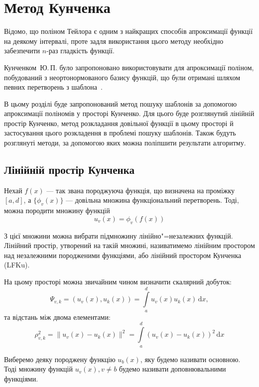 \chapter{Метод Кунченка}
\label{chap:selected}

Відомо, що поліном Тейлора є одним з найкращих способів апроксимації функції на деякому інтервалі, проте задля
використання цього методу необхідно забезпечити $n$-раз гладкість функції.

Кунченком~Ю.\,П. було запропоновано використовувати для апроксимації поліном, побудований з неортонормованого базису
функцій, що були отримані шляхом певних перетворень з шаблона~\cite{book6}.

В цьому розділі буде запропонований метод пошуку шаблонів за допомогою апроксимації поліномів у просторі Кунченко.
Для цього буде розглянутий лінійній простір Кунченко, метод розкладання довільної функції в цьому просторі й
застосування цього розкладення в проблемі пошуку шаблонів.
Також будуть розглянуті методи, за допомогою яких можна поліпшити результати алгоритму.

\section{Лінійній простір Кунченка}
    Нехай $f(x)$ --- так звана породжуюча функція, що визначена на проміжку ${[a, d]}$, а $\{ \phi_v( x ) \}$ ---
    довільна множина функціональний перетворень.
    Тоді, можна породити множину функцій
    \begin{equation}
        u_v(x) = \phi_v( f( x ))
    \end{equation}

    З цієї множини можна вибрати підмножину лінійно"=незалежних функцій.
    Лінійний простір, утворений на такій множині, називатимемо лінійним простором над незалежними породженими
    функціями, або лінійний простором Кунченка (LFKu).

    На цьому просторі можна звичайним чином визначити скалярний добуток:
    \begin{equation}
        \Psi_{v,k} = (u_v( x ), u_k( x ) ) = \int\limits_a^d u_v( x ) u_k( x )\,\mathrm{d}x,
    \end{equation}
    та відстань між двома елементами:
    \begin{equation}
        \rho_{v,k}^2 = \|u_v( x ) - u_k( x )\|^2 = \int\limits_a^d\left(u_v(x) - u_k(x)\right)^2\,\mathrm{d}x
    \end{equation}

    Виберемо деяку породжену функцію $u_b(x)$, яку будемо називати основною.
    Тоді множину функцій $u_v(x), v \ne b$ будемо називати доповнювальними функціями.

